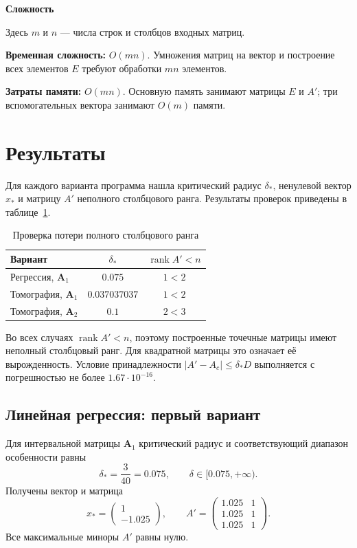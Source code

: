 \documentclass[12pt,a4paper]{article}
\numberwithin{equation}{section}
\newcommand{\theorypart}[1]{%
    \par\medskip
    \noindent\textbf{#1}\par\nopagebreak\smallskip
}
\begin{document}
\theorypart{Сложность}

\noindent
Здесь $m$ и $n$ --- числа строк и столбцов входных матриц.

\smallskip
\noindent
\textbf{Временная сложность:} $O(mn)$. Умножения матриц на вектор
и построение всех элементов $E$ требуют обработки $mn$ элементов.

\smallskip
\noindent
\textbf{Затраты памяти:} $O(mn)$. Основную память занимают матрицы
$E$ и $A'$; три вспомогательных вектора занимают $O(m)$ памяти.

\section{Результаты}

Для каждого варианта программа нашла критический радиус $\delta_*$,
ненулевой вектор $x_*$ и матрицу $A'$ неполного столбцового ранга.
Результаты проверок приведены в таблице~\ref{tab:results-check}.

\begin{table}[ht]
    \centering
    \caption{Проверка потери полного столбцового ранга}
    \label{tab:results-check}
    \begin{tabular}{@{}lcc@{}}
        \toprule
        Вариант & $\delta_*$ & $\operatorname{rank} A'<n$ \\
        \midrule
        Регрессия, $\boldsymbol{A}_1$   & $0.075$      & $1<2$ \\
        Томография, $\boldsymbol{A}_1$ & $0.037037037$ & $1<2$ \\
        Томография, $\boldsymbol{A}_2$ & $0.1$         & $2<3$ \\
        \bottomrule
    \end{tabular}
\end{table}

Во всех случаях $\operatorname{rank}A'<n$, поэтому построенные точечные
матрицы имеют неполный столбцовый ранг. Для квадратной матрицы это
означает её вырожденность. Условие принадлежности
$|A'-A_c|\leq\delta_*D$ выполняется с погрешностью не более
$1.67\cdot10^{-16}$.

\subsection{Линейная регрессия: первый вариант}

Для интервальной матрицы $\boldsymbol{A}_1$ критический радиус и
соответствующий диапазон особенности равны
\[
    \delta_*=\frac{3}{40}=0.075,
    \qquad
    \delta\in[0.075,+\infty).
\]
Получены вектор и матрица
\[
    x_*=\begin{pmatrix}1\\-1.025\end{pmatrix},
    \qquad
    A'=\begin{pmatrix}
        1.025 & 1 \\
        1.025 & 1 \\
        1.025 & 1
    \end{pmatrix}.
\]
Все максимальные миноры $A'$ равны нулю.
\end{document}
